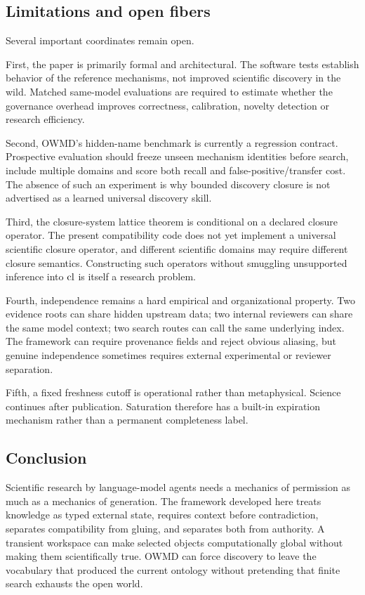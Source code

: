 \subsection{Limitations and open fibers}

Several important coordinates remain open.

First, the paper is primarily formal and architectural. The software tests establish behavior of the reference mechanisms, not improved scientific discovery in the wild. Matched same-model evaluations are required to estimate whether the governance overhead improves correctness, calibration, novelty detection or research efficiency.

Second, OWMD's hidden-name benchmark is currently a regression contract. Prospective evaluation should freeze unseen mechanism identities before search, include multiple domains and score both recall and false-positive/transfer cost. The absence of such an experiment is why bounded discovery closure is not advertised as a learned universal discovery skill.

Third, the closure-system lattice theorem is conditional on a declared closure operator. The present compatibility code does not yet implement a universal scientific closure operator, and different scientific domains may require different closure semantics. Constructing such operators without smuggling unsupported inference into \(\operatorname{cl}\) is itself a research problem.

Fourth, independence remains a hard empirical and organizational property. Two evidence roots can share hidden upstream data; two internal reviewers can share the same model context; two search routes can call the same underlying index. The framework can require provenance fields and reject obvious aliasing, but genuine independence sometimes requires external experimental or reviewer separation.

Fifth, a fixed freshness cutoff is operational rather than metaphysical. Science continues after publication. Saturation therefore has a built-in expiration mechanism rather than a permanent completeness label.

\subsection{Conclusion}

Scientific research by language-model agents needs a mechanics of permission as much as a mechanics of generation. The framework developed here treats knowledge as typed external state, requires context before contradiction, separates compatibility from gluing, and separates both from authority. A transient workspace can make selected objects computationally global without making them scientifically true. OWMD can force discovery to leave the vocabulary that produced the current ontology without pretending that finite search exhausts the open world.

